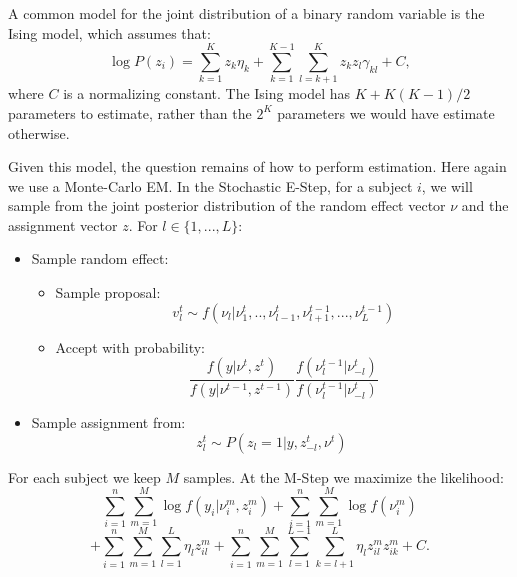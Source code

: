 \documentclass{article}\usepackage[]{graphicx}\usepackage[]{color}
\begin{document}
A common model for the joint distribution of a binary random variable is the Ising model, which assumes that:
$$
\log P(z_i) = \sum_{k=1}^{K} z_{k} \eta_k + \sum_{k=1}^{K - 1}\sum_{l=k + 1}^{K} z_{k} z_{l} \gamma_{kl} + C,
$$
where $C$ is a normalizing constant. The Ising model has $K + K(K-1)/2$ parameters to estimate, rather than the $2^{K}$ parameters we would have estimate otherwise. 

Given this model, the question remains of how to perform estimation. Here again we use a Monte-Carlo EM. In the Stochastic E-Step, for a subject $i$, we will sample from the joint posterior distribution of the random effect vector $\nu$ and the assignment vector $z$. For $l \in \{1,...,L\}$: 
\begin{itemize}
\item Sample random effect:
	\begin{itemize}
	\item Sample proposal:
	$$
	v_l^{t} \sim f(\nu_l | \nu_{1}^{t},..,\nu_{l-1}^{t}, \nu_{l+1}^{t-1},...,\nu_{L}^{t-1})
	$$
	\item  Accept with probability:
	$$
	\frac{f(y | \nu^{t}, z^{t})}{f(y | \nu^{t-1}, z^{t-1})} 
	\frac{f(\nu_l^{t-1}|\nu_{-l}^{t})}{f(\nu_l^{t-1}|\nu_{-l}^{t})}
	$$
	\end{itemize}
	
\item Sample assignment from:
$$
z_l^{t} \sim P(z_l = 1 | y, z_{-l}^{t}, \nu^t)
$$
\end{itemize}
For each subject we keep $M$ samples. At the M-Step we maximize the likelihood:
$$
\sum_{i=1}^{n}\sum_{m=1}^{M} \log f(y_i | \nu_i^m, z^m_i)  +
\sum_{i=1}^{n} \sum_{m=1}^{M} \log f(\nu_i^m)
$$$$
+ \sum_{i=1}^{n}\sum_{m=1}^{M}\sum_{l=1}^{L} \eta_l z_{il}^m
+ \sum_{i=1}^{n}\sum_{m=1}^{M}\sum_{l=1}^{L-1}\sum_{k=l+1}^{L} \eta_l z_{il}^m z_{ik}^{m} + C.
$$
\end{document}
